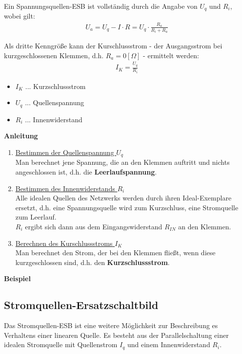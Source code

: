 Ein Spannungsquellen-ESB ist vollständig durch die Angabe von $U_q$ und $R_i$, wobei gilt:
\begin{align}
    U_a=U_q - I\cdot R = U_q \cdot \frac{R_a}{R_i+R_a}
\end{align}

Als dritte Kenngröße kann der Kurschlussstrom - der Ausgangsstrom bei kurzgeschlossenen Klemmen, d.h. $R_a = 0[\Omega]$ - ermittelt werden:
\begin{align}
    I_K = \frac{U_q}{R_i}
\end{align}
\begin{itemize}
    \item $I_K$ ... Kurzschlussstrom
    \item $U_q$ ... Quellenspannung
    \item $R_i$ ... Innenwiderstand
\end{itemize}

\textbf{Anleitung} \\
\begin{enumerate}
    \item \underline{Bestimmen der Quellenspannung $U_q$} \\
    Man berechnet jene Spannung, die an den Klemmen auftritt und nichts angeschlossen ist, d.h. die \textbf{Leerlaufspannung}.
    
    \item \underline{Bestimmen des Innenwiderstands $R_i$} \\
    Alle idealen Quellen des Netzwerks werden durch ihren Ideal-Exemplare ersetzt, d.h. eine Spannungsquelle wird zum Kurzschluss, eine Stromquelle zum Leerlauf. \\
    $R_i$ ergibt sich dann aus dem Eingangswiderstand $R_{IN}$ an den Klemmen.
    
    \item \underline{Berechnen des Kurschlussstroms $I_K$} \\
    Man berechnet den Strom, der bei den Klemmen fließt, wenn diese kurzgeschlossen sind, d.h. den \textbf{Kurzschlussstrom}.
\end{enumerate}

\textbf{Beispiel} \\

\subsection{Stromquellen-Ersatzschaltbild}
Das Stromquellen-ESB ist eine weitere Möglichkeit zur Beschreibung es Verhaltens einer linearen Quelle. Es besteht aus der Parallelschaltung einer idealen Stromquelle mit Quellenstrom $I_q$ und einem Innenwiderstand $R_i$. \\


